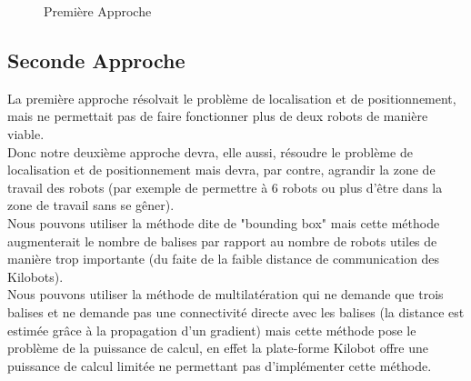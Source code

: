 \documentclass[a4paper,8pt]{report}
\begin{document}
\begin{figure}
  \caption{Premi\`ere Approche}
  \label{figureI}
\end{figure}

\subsection*{Seconde Approche}\label{sec:name}

La premi\`ere approche r\'esolvait le probl\`eme de localisation et de positionnement, mais ne permettait pas de faire fonctionner plus de deux robots de mani\`ere viable.\\
Donc notre deuxi\`eme approche devra, elle aussi, r\'esoudre le probl\`eme de localisation et de positionnement mais devra, par contre, agrandir la zone de travail des robots (par exemple de permettre \`a 6 robots ou plus d'\^etre dans la zone de travail sans se g\^ener).\\

\medskip
Nous pouvons utiliser la m\'ethode dite de "bounding box" mais cette m\'ethode augmenterait le nombre de balises par rapport au nombre de robots utiles de mani\`ere trop importante (du faite de la faible distance de communication des Kilobots).\\
Nous pouvons utiliser la m\'ethode de multilat\'eration qui ne demande que trois balises et ne demande pas une connectivit\'e directe avec les balises (la distance est estim\'ee gr\^ace \`a la propagation d'un gradient) mais cette m\'ethode pose le probl\`eme de la puissance de calcul, en effet la plate-forme Kilobot offre une puissance de calcul limit\'ee ne permettant pas d'impl\'ementer cette m\'ethode.\\
\end{document}
